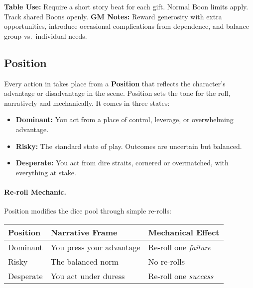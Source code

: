 \textbf{Table Use:} Require a short story beat for each gift. Normal Boon limits apply. Track shared Boons openly.  
\textbf{GM Notes:} Reward generosity with extra opportunities, introduce occasional complications from dependence, and balance group vs.\ individual needs.

\subsection{Position}
\label{subsec:position}

Every action in  takes place from a \textbf{Position} that reflects the character’s advantage or disadvantage in the scene. Position sets the tone for the roll, narratively and mechanically. It comes in three states:

\begin{itemize}
  \item \textbf{Dominant:} You act from a place of control, leverage, or overwhelming advantage.
  \item \textbf{Risky:} The standard state of play. Outcomes are uncertain but balanced.
  \item \textbf{Desperate:} You act from dire straits, cornered or overmatched, with everything at stake.
\end{itemize}

\paragraph{Re-roll Mechanic.}  
Position modifies the dice pool through simple re-rolls:
\begin{center}
\begin{tabular}{@{}lll@{}}
\toprule
\textbf{Position} & \textbf{Narrative Frame} & \textbf{Mechanical Effect} \\
\midrule
Dominant & You press your advantage & Re-roll one \emph{failure} \\
Risky    & The balanced norm & No re-rolls \\
Desperate & You act under duress & Re-roll one \emph{success} \\
\bottomrule
\end{tabular}
\end{center}

